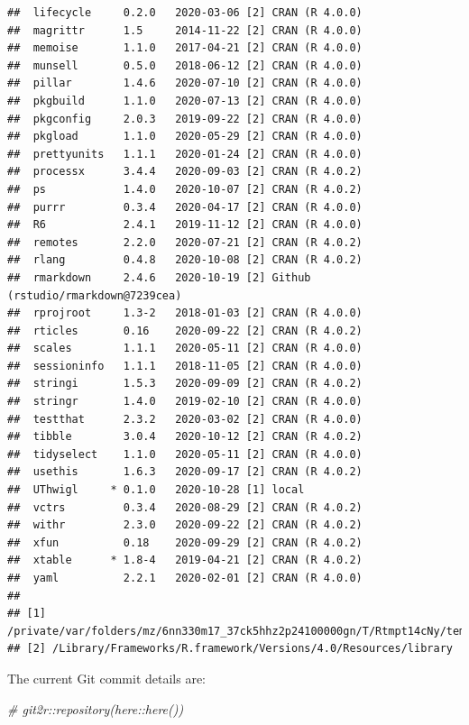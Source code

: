 \documentclass[]{elsarticle} %
\newenvironment{Shaded}{\begin{snugshade}}{\end{snugshade}}
\newcommand{\CommentTok}[1]{\textcolor[rgb]{0.56,0.35,0.01}{\textit{#1}}}
\begin{document}
\begin{verbatim}
##  lifecycle     0.2.0   2020-03-06 [2] CRAN (R 4.0.0)                    
##  magrittr      1.5     2014-11-22 [2] CRAN (R 4.0.0)                    
##  memoise       1.1.0   2017-04-21 [2] CRAN (R 4.0.0)                    
##  munsell       0.5.0   2018-06-12 [2] CRAN (R 4.0.0)                    
##  pillar        1.4.6   2020-07-10 [2] CRAN (R 4.0.0)                    
##  pkgbuild      1.1.0   2020-07-13 [2] CRAN (R 4.0.0)                    
##  pkgconfig     2.0.3   2019-09-22 [2] CRAN (R 4.0.0)                    
##  pkgload       1.1.0   2020-05-29 [2] CRAN (R 4.0.0)                    
##  prettyunits   1.1.1   2020-01-24 [2] CRAN (R 4.0.0)                    
##  processx      3.4.4   2020-09-03 [2] CRAN (R 4.0.2)                    
##  ps            1.4.0   2020-10-07 [2] CRAN (R 4.0.2)                    
##  purrr         0.3.4   2020-04-17 [2] CRAN (R 4.0.0)                    
##  R6            2.4.1   2019-11-12 [2] CRAN (R 4.0.0)                    
##  remotes       2.2.0   2020-07-21 [2] CRAN (R 4.0.2)                    
##  rlang         0.4.8   2020-10-08 [2] CRAN (R 4.0.2)                    
##  rmarkdown     2.4.6   2020-10-19 [2] Github (rstudio/rmarkdown@7239cea)
##  rprojroot     1.3-2   2018-01-03 [2] CRAN (R 4.0.0)                    
##  rticles       0.16    2020-09-22 [2] CRAN (R 4.0.2)                    
##  scales        1.1.1   2020-05-11 [2] CRAN (R 4.0.0)                    
##  sessioninfo   1.1.1   2018-11-05 [2] CRAN (R 4.0.0)                    
##  stringi       1.5.3   2020-09-09 [2] CRAN (R 4.0.2)                    
##  stringr       1.4.0   2019-02-10 [2] CRAN (R 4.0.0)                    
##  testthat      2.3.2   2020-03-02 [2] CRAN (R 4.0.0)                    
##  tibble        3.0.4   2020-10-12 [2] CRAN (R 4.0.2)                    
##  tidyselect    1.1.0   2020-05-11 [2] CRAN (R 4.0.0)                    
##  usethis       1.6.3   2020-09-17 [2] CRAN (R 4.0.2)                    
##  UThwigl     * 0.1.0   2020-10-28 [1] local                             
##  vctrs         0.3.4   2020-08-29 [2] CRAN (R 4.0.2)                    
##  withr         2.3.0   2020-09-22 [2] CRAN (R 4.0.2)                    
##  xfun          0.18    2020-09-29 [2] CRAN (R 4.0.2)                    
##  xtable      * 1.8-4   2019-04-21 [2] CRAN (R 4.0.2)                    
##  yaml          2.2.1   2020-02-01 [2] CRAN (R 4.0.0)                    
## 
## [1] /private/var/folders/mz/6nn330m17_37ck5hhz2p24100000gn/T/Rtmpt14cNy/temp_libpathe6f029e5ec8
## [2] /Library/Frameworks/R.framework/Versions/4.0/Resources/library
\end{verbatim}

The current Git commit details are:

\begin{Shaded}
\begin{Highlighting}[]
\CommentTok{\# git2r::repository(here::here())}
\end{Highlighting}
\end{Shaded}
\end{document}
